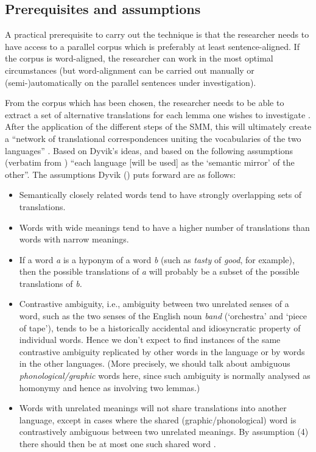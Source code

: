 \subsection{Prerequisites and assumptions}
\label{sec:3.4.2}
A practical prerequisite to carry out the technique is that the researcher needs to have access to a parallel corpus which is preferably at least sentence-aligned. If the corpus is word-aligned, the researcher can work in the most optimal circumstances (but word-alignment can be carried out manually or (semi-)automatically on the parallel sentences under investigation).

From the corpus which has been chosen, the researcher needs to be able to extract a set of alternative translations for each lemma one wishes to investigate \citep[31]{langemets_translations_2005}. After the application of the different steps of the SMM, this will ultimately create a “network of translational correspondences uniting the vocabularies of the two languages” \citep[31]{langemets_translations_2005}. Based on Dyvik’s ideas, and based on the following assumptions (verbatim from \citealt[31--32]{langemets_translations_2005}) “each language [will be used] as the ‘semantic mirror’ of the other”. The assumptions Dyvik (\citep[31--32]{langemets_translations_2005}) puts forward are as follows:

\begin{itemize}
\item
Semantically closely related words tend to have strongly overlapping sets of translations.
\item
Words with wide meanings tend to have a higher number of translations than words with narrow meanings.
\item
If a word \textit{a} is a hyponym of a word \textit{b} (such as \textit{tasty} of \textit{good}, for example), then the possible translations of \textit{a} will probably be a subset of the possible translations of \textit{b.}
\item
Contrastive ambiguity, i.e., ambiguity between two unrelated senses of a word, such as the two senses of the English noun \textit{band} (‘orchestra’ and ‘piece of tape’), tends to be a historically accidental and idiosyncratic property of individual words. Hence we don’t expect to find instances of the same contrastive ambiguity replicated by other words in the language or by words in the other languages. (More precisely, we should talk about ambiguous \textit{phonological/graphic} words here, since such ambiguity is normally analysed as homonymy and hence as involving two lemmas.)
\item
Words with unrelated meanings will not share translations into another language, except in cases where the shared (graphic/phonological) word is contrastively ambiguous between two unrelated meanings. By assumption (4) there should then be at most one such shared word \citep[31--32]{langemets_translations_2005}.
\end{itemize}


